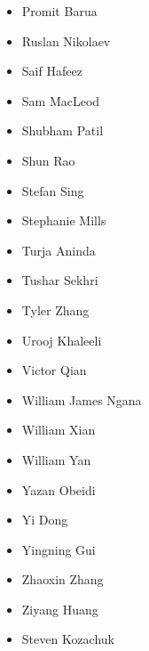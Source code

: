 \documentclass[main.tex]{subfiles}
\begin{document}
\begin{multicols}{3}
\begin{itemize}[label={},noitemsep]
     \item {Promit Barua}
	 \item {Ruslan Nikolaev}
     \item {Saif Hafeez}
	 \item {Sam MacLeod}
     \item {Shubham Patil}
	 \item {Shun Rao}
     \item {Stefan Sing}
	 \item {Stephanie Mills}
     \item {Turja Aninda}
	 \item {Tushar Sekhri}
     \item {Tyler Zhang}
	 \item {Urooj Khaleeli}
     \item {Victor Qian}
	 \item {William James Ngana}
     \item {William Xian}
	 \item {William Yan}
     \item {Yazan Obeidi}
	 \item {Yi Dong}
     \item {Yingning Gui}
	 \item {Zhaoxin Zhang}
     \item {Ziyang Huang}
	 \item {Steven Kozachuk}
\end{itemize}
\end{multicols}
\newpage
\end{document}

